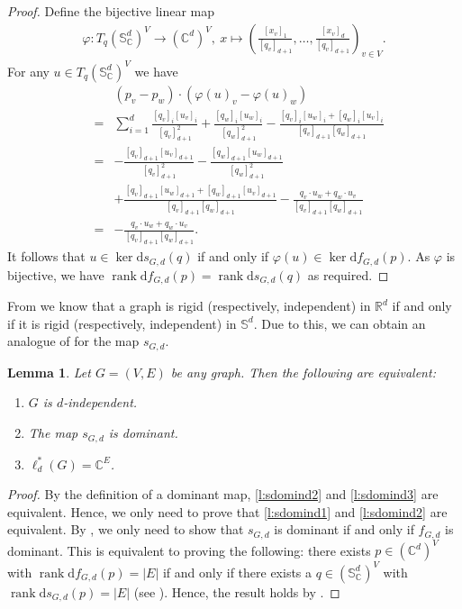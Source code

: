 \documentclass[11pt]{article}
\newtheorem{lemma}[theo]{Lemma}
\theoremstyle{definition}
\numberwithin{equation}{section}
\DeclareMathOperator{\rank}{rank}
\newcommand{\diff}{\mathrm{d}}
\begin{document}
\begin{proof}
	Define the bijective linear map
	\begin{align*}
		\varphi \colon T_q (\mathbb{S}_{\mathbb{C}}^{d})^{V} \rightarrow (\mathbb{C}^{d})^V, ~ x \mapsto \left( \frac{[x_v]_1}{[q_v]_{d+1}},\ldots, \frac{[x_v]_d}{[q_v]_{d+1}} \right)_{v \in V}.
	\end{align*}
	For any $u \in T_q (\mathbb{S}_{\mathbb{C}}^{d})^{V}$ we have
	\begin{eqnarray*}
		&~& (p_v-p_w)\cdot (\varphi(u)_v- \varphi(u)_w)\\
		&=& \sum_{i=1}^d \frac{[q_v]_i[u_v]_i}{[q_v]^2_{d+1}} +\frac{[q_w]_i[u_w]_i}{[q_w]^2_{d+1}} - \frac{[q_v]_i[u_w]_i + [q_w]_i[u_v]_i}{[q_v]_{d+1}[q_w]_{d+1}} \\
		&=& -\frac{[q_v]_{d+1}[u_v]_{d+1}}{[q_v]^2_{d+1}}-\frac{[q_w]_{d+1}[u_w]_{d+1}}{[q_w]^2_{d+1}} \\
		&&+ \frac{[q_v]_{d+1}[u_w]_{d+1} +[q_w]_{d+1}[u_v]_{d+1}}{[q_v]_{d+1}[q_w]_{d+1}} - \frac{q_v\cdot u_w + q_w \cdot u_v}{[q_v]_{d+1}[q_w]_{d+1}} \\
		&=& - \frac{q_v \cdot u_w + q_w \cdot u_v}{[q_v]_{d+1}[q_w]_{d+1}}.
	\end{eqnarray*}
		It follows that $u \in \ker \diff s_{G,d}(q)$ if and only if $\varphi(u) \in \ker \diff f_{G,d}(p)$.
		As $\varphi$ is bijective,
		we have $\rank \diff f_{G,d}(p)= \rank \diff s_{G,d}(q)$ as required.
\end{proof}

From  we know that a graph is rigid (respectively, independent) in $\mathbb{R}^d$ if and only if it is rigid (respectively, independent) in $\mathbb{S}^d$.
Due to this, we can obtain an analogue of  for the map $s_{G,d}$.

\begin{lemma}\label{l:domindsphere}
	Let $G=(V,E)$ be any graph.
	Then the following are equivalent:
	\begin{enumerate}
		\item \label{l:sdomind1} $G$ is $d$-independent.
		\item \label{l:sdomind2} The map $s_{G,d}$ is dominant.	
		\item \label{l:sdomind3} $\ell_d^*(G) = \mathbb{C}^E$.
	\end{enumerate}
\end{lemma} 

\begin{proof}
	By the definition of a dominant map, \ref{l:sdomind2} and \ref{l:sdomind3} are equivalent.
	Hence, we only need to prove that \ref{l:sdomind1} and \ref{l:sdomind2} are equivalent.
	By ,
	we only need to show that $s_{G,d}$ is dominant if and only if $f_{G,d}$ is dominant.
	This is equivalent to proving the following:
	there exists $p \in (\mathbb{C}^{d})^V$ with $\rank \diff f_{G,d}(p) = |E|$ if and only if
	there exists a $q \in (\mathbb{S}_{\mathbb{C}}^{d})^V$ with $\rank \diff s_{G,d}(p) = |E|$ (see ).
	Hence, the result holds by .
\end{proof}
\end{document}
